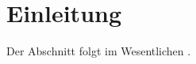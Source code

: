 \documentclass[../main/main.tex]{subfiles}
\begin{document}
	
	\section{Einleitung}
	
	Der Abschnitt  folgt im Wesentlichen \cite[Kapitel 4.14]{Simon.2015}.
	
	
\end{document}
